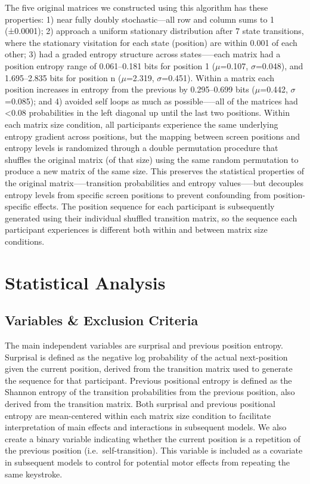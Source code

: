 \documentclass[
  10pt,
  letterpaper]{article}
\begin{document}
The five original matrices we constructed using this algorithm has these
properties: 1) near fully doubly stochastic---all row and column sums to
1 (±0.0001); 2) approach a uniform stationary distribution after 7 state
transitions, where the stationary visitation for each state (position)
are within 0.001 of each other; 3) had a graded entropy structure across
states-----each matrix had a position entropy range of 0.061--0.181 bits
for position 1 (\(\mu\)=0.107, \(\sigma\)=0.048), and 1.695--2.835 bits
for position n (\(\mu\)=2.319, \(\sigma\)=0.451). Within a matrix each
position increases in entropy from the previous by 0.295--0.699 bits
(\(\mu\)=0.442, \(\sigma\)=0.085); and 4) avoided self loops as much as
possible-----all of the matrices had \textless0.08 probabilities in the
left diagonal up until the last two positions. Within each matrix size
condition, all participants experience the same underlying entropy
gradient across positions, but the mapping between screen positions and
entropy levels is randomized through a double permutation procedure that
shuffles the original matrix (of that size) using the same random
permutation to produce a new matrix of the same size. This preserves the
statistical properties of the original matrix-----transition
probabilities and entropy values-----but decouples entropy levels from
specific screen positions to prevent confounding from position-specific
effects. The position sequence for each participant is subsequently
generated using their individual shuffled transition matrix, so the
sequence each participant experiences is different both within and
between matrix size conditions.

\section{Statistical Analysis}\label{statistical-analysis}

\subsection{Variables \& Exclusion
Criteria}\label{variables-exclusion-criteria}

The main independent variables are surprisal and previous position
entropy. Surprisal is defined as the negative log probability of the
actual next-position given the current position, derived from the
transition matrix used to generate the sequence for that participant.
Previous positional entropy is defined as the Shannon entropy of the
transition probabilities from the previous position, also derived from
the transition matrix. Both surprisal and previous positional entropy
are mean-centered within each matrix size condition to facilitate
interpretation of main effects and interactions in subsequent models. We
also create a binary variable indicating whether the current position is
a repetition of the previous position (i.e.~self-transition). This
variable is included as a covariate in subsequent models to control for
potential motor effects from repeating the same keystroke.
\end{document}
